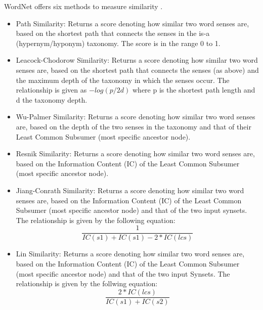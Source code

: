 \documentclass{article}
\begin{document}
WordNet offers six methods to measure similarity \citep{pedersen2004wordnet}. %
\begin{itemize}
	\item Path Similarity: Returns a score denoting how similar two word senses are, based on the shortest path that connects the senses in the is-a (hypernym/hyponym) taxonomy. The score is in the range 0 to 1. %
	\item Leacock-Chodorow Similarity: Returns a score denoting how similar two word senses are, based on the shortest path that connects the senses (as above) and the maximum depth of the taxonomy in which the senses occur. The relationship is given as \(-log(p/2d)\) where p is the shortest path length and d the taxonomy depth. %
	\item Wu-Palmer Similarity: Returns a score denoting how similar two word senses are, based on the depth of the two senses in the taxonomy and that of their Least Common Subsumer (most specific ancestor node). %
	\item Resnik Similarity: Returns a score denoting how similar two word senses are, based on the Information Content (IC) of the Least Common Subsumer (most specific ancestor node). %
	\item Jiang-Conrath Similarity: Returns a score denoting how similar two word senses are, based on the Information Content (IC) of the Least Common Subsumer (most specific ancestor node) and that of the two input synsets. The relationship is given by the following equation:
\begin{equation} \label{eq:jcnsimilarity}
	\frac{1} {IC(s1) + IC(s1) - 2 * IC(lcs)}
\end{equation}
	\item Lin Similarity: Returns a score denoting how similar two word senses are, based on the Information Content (IC) of the Least Common Subsumer (most specific ancestor node) and that of the two input Synsets. The relationship is given by the follwing equation:
\begin{equation} \label{eq:linsimilarity}
	\frac{2 * IC(lcs)} {IC(s1) + IC(s2)} 
\end{equation} 
\end{itemize}
\end{document}
